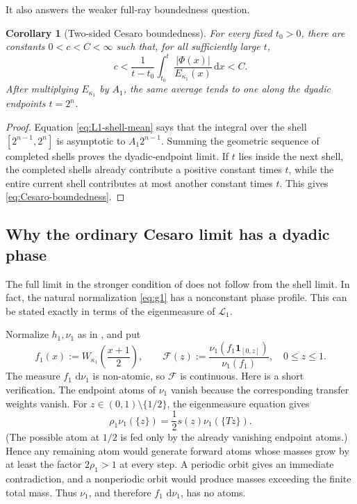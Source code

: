 \documentclass[11pt,oneside]{article}
\newtheorem{corollary}[theorem]{Corollary}
\theoremstyle{definition}
\theoremstyle{remark}
\newcommand{\dd}{\,\mathrm d}
\newcommand{\Phiup}{\Phi}
\newcommand{\abs}[1]{\left|#1\right|}
\begin{document}
It also answers the weaker full-ray boundedness question.

\begin{corollary}[Two-sided Cesaro boundedness]
\label{cor:Cesaro-boundedness}
For every fixed $t_0>0$, there are constants $0<c<C<\infty$ such that, for all sufficiently
large $t$,
\begin{equation}
 c<\frac1{t-t_0}\int_{t_0}^{t}
 \frac{\abs{\Phiup(x)}}{E_{\kappa_1}(x)}\dd x<C.
 \label{eq:Cesaro-boundedness}
\end{equation}
After multiplying $E_{\kappa_1}$ by $A_1$, the same average tends to one along the dyadic
endpoints $t=2^n$.
\end{corollary}

\begin{proof}
Equation \eqref{eq:L1-shell-mean} says that the integral over the shell
$[2^{n-1},2^n]$ is asymptotic to $A_1 2^{n-1}$.  Summing the geometric sequence of completed
shells proves the dyadic-endpoint limit.  If $t$ lies inside the next shell, the completed
shells already contribute a positive constant times $t$, while the entire current shell
contributes at most another constant times $t$.  This gives \eqref{eq:Cesaro-boundedness}.
\end{proof}

\subsection{Why the ordinary Cesaro limit has a dyadic phase}
\label{subsec:phase-profile}

The full limit in the stronger condition of \cite{mse-decay} does not follow from the shell
limit.  In fact, the natural normalization \eqref{eq:g1} has a nonconstant phase profile.
This can be stated exactly in terms of the eigenmeasure of $\mathcal L_1$.

Normalize $h_1,\nu_1$ as in , and put
\[
 f_1(x):=W_{\kappa_1}\!\left(\frac{x+1}{2}\right),
 \qquad
 \mathscr F(z):=
 \frac{\nu_1(f_1\mathbf1_{[0,z]})}{\nu_1(f_1)},
 \quad 0\le z\le1.
 \label{eq:phase-distribution}
\]
The measure $f_1\,\dd\nu_1$ is non-atomic, so $\mathscr F$ is continuous.  Here is a
short verification.  The endpoint atoms of $\nu_1$ vanish because the corresponding
transfer weights vanish.  For $z\in(0,1)\setminus\{1/2\}$, the eigenmeasure equation gives
\[
 \rho_1\nu_1(\{z\})=\frac12s(z)\nu_1(\{Tz\}).
\]
(The possible atom at $1/2$ is fed only by the already vanishing endpoint atoms.)  Hence any
remaining atom would generate forward atoms whose masses grow by at least the factor
$2\rho_1>1$ at every step.  A periodic orbit gives an immediate contradiction, and a
nonperiodic orbit would produce masses exceeding the finite total mass.  Thus $\nu_1$, and
therefore $f_1\,\dd\nu_1$, has no atoms.
\end{document}

